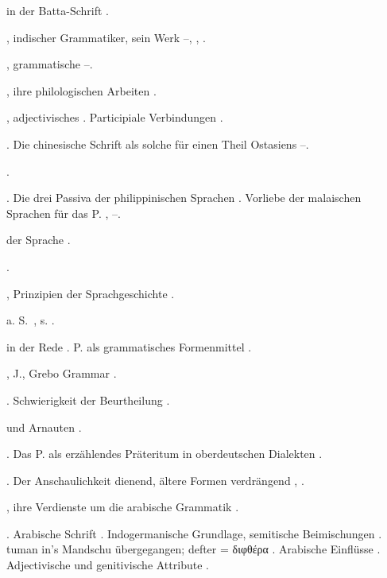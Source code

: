 \begin{register}
 in der Batta-Schrift \pageref{sp.131}.

, indischer Grammatiker, sein Werk \pageref{sp.22}–\pageref{sp.23}, \pageref{sp.111}, \pageref{sp.113}.


, grammatische \pageref{sp.116}–\pageref{sp.119}.

, ihre philologischen Arbeiten \pageref{sp.22}.


, adjectivisches \pageref{sp.101}. Participiale Verbindungen \pageref{sp.465}.

. Die chinesische Schrift als solche für einen Theil Ostasiens \pageref{sp.129}–\pageref{sp.130}.

 \pageref{sp.253}.

 \pageref{sp.102}. Die drei Passiva der philippinischen Sprachen \pageref{sp.363}. Vorliebe der malaischen Sprachen für das P. \pageref{sp.415}, \pageref{sp.419}–\pageref{sp.420}.

 der Sprache \pageref{sp.17}.

 \pageref{sp.126}.

, Prinzipien der Sprachgeschichte \pageref{sp.136}.

 a. S.~, s. .

 in der Rede \pageref{sp.225}. P. als grammatisches Formenmittel \pageref{sp.451}.

, J., Grebo Grammar \pageref{sp.379}.

 \sed{\pageref{sp.269}, \pageref{sp.273}}. Schwierigkeit der Beurtheilung \pageref{sp.426}.

 und Arnauten \pageref{sp.146}.


 \pageref{sp.103}. Das P. als erzählendes Präteritum in oberdeutschen Dialekten \pageref{sp.253}.

 \pageref{sp.183}. Der Anschaulichkeit dienend, ältere Formen verdrängend \pageref{sp.241}, \pageref{sp.256}.

, ihre Verdienste um die arabische Grammatik \pageref{sp.22}.

. Arabische Schrift \pageref{sp.129}. Indogermanische Grundlage, semitische Beimischungen \pageref{sp.158}. tuman in’s Mandschu übergegangen; defter = διφθέρα \pageref{sp.264}. Arabische Einflüsse \pageref{sp.271}. Adjectivische und genitivische Attribute \pageref{sp.457}.


\end{register}
